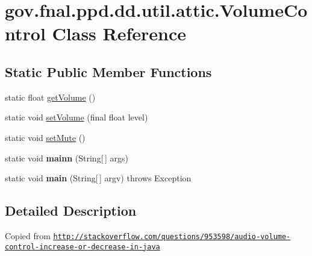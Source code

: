 \hypertarget{classgov_1_1fnal_1_1ppd_1_1dd_1_1util_1_1attic_1_1VolumeControl}{\section{gov.\-fnal.\-ppd.\-dd.\-util.\-attic.\-Volume\-Control Class Reference}
\label{classgov_1_1fnal_1_1ppd_1_1dd_1_1util_1_1attic_1_1VolumeControl}
}
\subsection*{Static Public Member Functions}
\begin{DoxyCompactItemize}
\item 
static float \hyperlink{classgov_1_1fnal_1_1ppd_1_1dd_1_1util_1_1attic_1_1VolumeControl_a4fad844a89e3d15bb9db64d04ab2f8be}{get\-Volume} ()
\item 
static void \hyperlink{classgov_1_1fnal_1_1ppd_1_1dd_1_1util_1_1attic_1_1VolumeControl_a0b9502a12b699ac76d40f8ee8c9ea8bc}{set\-Volume} (final float level)
\item 
static void \hyperlink{classgov_1_1fnal_1_1ppd_1_1dd_1_1util_1_1attic_1_1VolumeControl_ab34248202f07f5481b1e6515669fa717}{set\-Mute} ()
\item 
\hypertarget{classgov_1_1fnal_1_1ppd_1_1dd_1_1util_1_1attic_1_1VolumeControl_a396c9dce91fb1f8e15e75c1a70c9aef0}{static void {\bfseries mainn} (String\mbox{[}$\,$\mbox{]} args)}\label{classgov_1_1fnal_1_1ppd_1_1dd_1_1util_1_1attic_1_1VolumeControl_a396c9dce91fb1f8e15e75c1a70c9aef0}

\item 
\hypertarget{classgov_1_1fnal_1_1ppd_1_1dd_1_1util_1_1attic_1_1VolumeControl_afe1229dd40b7dfde783205fe1428bb2f}{static void {\bfseries main} (String\mbox{[}$\,$\mbox{]} argv)  throws Exception }\label{classgov_1_1fnal_1_1ppd_1_1dd_1_1util_1_1attic_1_1VolumeControl_afe1229dd40b7dfde783205fe1428bb2f}

\end{DoxyCompactItemize}


\subsection{Detailed Description}
Copied from \href{http://stackoverflow.com/questions/953598/audio-volume-control-increase-or-decrease-in-java}{\tt http\-://stackoverflow.\-com/questions/953598/audio-\/volume-\/control-\/increase-\/or-\/decrease-\/in-\/java}

